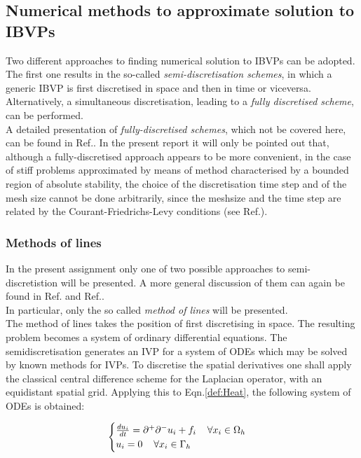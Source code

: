 \documentclass[11pt]{article}
\theoremstyle{theorem}
\theoremstyle{definition}
\begin{document}
\subsection{Numerical methods to approximate solution to IBVPs}
Two different approaches to finding numerical solution to IBVPs can be adopted. The first one results in the so-called \emph{semi-discretisation schemes}, in which a generic IBVP is first discretised in space and then in time or viceversa. Alternatively, a simultaneous discretisation, leading to a \emph{fully discretised scheme}, can be performed.\\
A detailed presentation of \emph{fully-discretised schemes}, which not be covered here, can be found in Ref.\cite{numerical-math}. In the present report it will only be pointed out that, although a fully-discretised approach appears to be more convenient, in the case of stiff problems approximated by means of method characterised by a bounded region of absolute stability, the choice of the discretisation time step and of the mesh size cannot be done arbitrarily, since the meshsize and the time step are related by the Courant-Friedrichs-Levy conditions (see Ref.\cite{numerical-math}).\\

\subsubsection{Methods of lines}
In the present assignment only one of two possible approaches to semi-discretistion will be presented. A more general discussion of them can again be found in Ref.\cite{numerical-math} and Ref.\cite{lec-notes}.\\
In particular, only the so called \emph{method of lines} will be presented.\\

The method of lines takes the position of first discretising in space. The resulting problem becomes a system of ordinary differential equations. The semidiscretisation generates an IVP for a system of ODEs which may be solved by known methods
for IVPs. To discretise the spatial derivatives one shall apply the classical central difference
scheme for the Laplacian operator, with an equidistant spatial grid. Applying this to Eqn.\eqref{def:Heat}, the following system of ODEs is obtained:


\begin{align}
\label{eqn:lines}
\begin{cases}
	\frac{du_i}{dt}=\partial^+\partial^-u_i+f_i\hspace{4mm}\forall x_i\in\Omega_h\\
	u_i=0 \hspace{4mm}\forall x_i\in\Gamma_h
\end{cases}
\end{align} 
\end{document}
